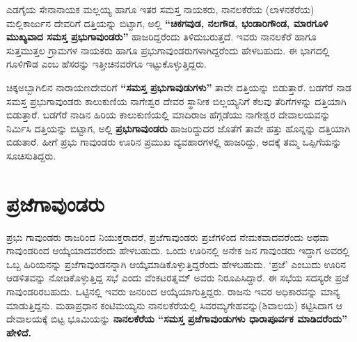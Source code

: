 ಎಡಗೈಯ ಸೇನಾನಾಯಕ ಮಲ್ಲಯ್ಯ ಹಾಗೂ ಇತರ ಸಮಸ್ತ ನಾಯಕರು, ನಾನಲಕೆರೆಯ (ಲಾಳನಕೆರೆಯ) ಮಲ್ಲಿಕಾರ್ಜುನ ದೇವರಿಗೆ ದತ್ತಿಯನ್ನು ಬಿಟ್ಟಾಗ, ಅಲ್ಲಿ \textbf{“ಚಿಕಗವುಡ, ನಲಗೌಡ, ಭಂಡಾರಿಗೌಂಡ, ಮಾರಗೂಳಿ ಮುಖ್ಯವಾದ ಸಮಸ್ತ ಪ್ರಭುಗಾವುಂಡರು”} ಹಾಜರಿದ್ದರೆಂದು ತಿಳಿದುಬರುತ್ತದೆ. ಇವರು ನಾನಲಕೆರೆ ಹಾಗೂ ಸುತ್ತಮುತ್ತಲ ಗ್ರಾಮಗಳ ನಾಯಕರು ಹಾಗೂ ಪ್ರಭುಗಾವುಂಡರುಗಳಾಗಿದ್ದರೆಂದು ಹೇಳಬಹುದು. ಈ ಭಾಗದಲ್ಲಿ ಗೂಳಿಗೌಡ ಎಂಬ ಹೆಸರನ್ನು ಇತ್ತೀಚಿನವರೆಗೂ ಇಟ್ಟುಕೊಳ್ಳುತ್ತಿದ್ದರು.

ಚಿಕ್ಕಅಬ್ಬಾಗಿಲಿನ ನಾರಾಯಣದೇವರಿಗೆ \textbf{“ಸಮಸ್ತ ಪ್ರಭುಗಾವುಡುಗಳು”} ತಾವೇ ದತ್ತಿಯನ್ನು ಬಿಡುತ್ತಾರೆ. ಬಡಗೆರೆ ನಾಡ ಸಮಸ್ತ ಪ್ರಭುಗಾವುಂಡರು ಕಾಲುಕುಣಿಯ ನಾಗೇಶ್ವರ ದೇವರ ಸ್ಥಾನೀಕ ಬಿಲ್ಲಯ್ಯನಿಗೆ ಕೆಲವು ತೆರಿಗೆಗಳನ್ನು ದತ್ತಿಯಾಗಿ ಬಿಡುತ್ತಾರೆ. ಬಡಗೆರೆ ನಾಡಿನ ಹಿರಿಯ ಕಾಲುಕುಣಿಯಲ್ಲಿ ಮಾದಿರಾಜ ಹೆಗ್ಗಡೆಯು ನಾಗೇಶ್ವರ ದೇವಾಲಯವನ್ನು ನಿರ್ಮಿಸಿ ದತ್ತಿಯನ್ನು ಬಿಟ್ಟಾಗ, ಅಲ್ಲಿ \textbf{ಪ್ರಭುಗಾವುಂಡರು} ಹಾಜರಿದ್ದುದರ ಜೊತೆಗೆ ತಾವೇ ಹತ್ತು ಹೊನ್ನನ್ನು ದತ್ತಿಯಾಗಿ ಬಿಡುತಾರೆ. ಹೀಗೆ ಪ್ರಭು ಗಾವುಂಡರು ಊರಿನ ಪ್ರಮುಖ ವ್ಯವಹಾರಗಳಲ್ಲಿ ಹಾಜರಿದ್ದು, ಅದಕ್ಕೆ ತಮ್ಮ ಒಪ್ಪಿಗೆಯನ್ನು ಸೂಚಿಸುತಿದ್ದರು.


\section{ಪ್ರಜೆಗಾವುಂಡರು}

ಪ್ರಭು ಗಾವುಂಡರು ರಾಜರಿಂದ ನಿಯುಕ್ತರಾದರೆ, ಪ್ರಜೆಗಾವುಂಡರು ಪ್ರಜೆಗಳಿಂದ ನೇಮಕವಾದವರೆಂದು ಅಥವಾ ಗಾವುಂಡ\-ರಿಂದ ಆಯ್ಕೆಯಾದವರೆಂದು ಹೇಳಬಹುದು. ಒಂದು ಊರಿನಲ್ಲಿ ಅನೇಕ ಜನ ಗಾವುಂಡರು ಇದ್ದಾಗ ಅವರಲ್ಲಿ ಒಬ್ಬ ಹಿರಿಯನನ್ನು ಪ್ರಜೆಗಾವುಂಡನನ್ನಾಗಿ ಆಯ್ಕೆಮಾಡಿಕೊಳ್ಳುತ್ತಿದ್ದರೆಂದು ಹೇಳಬಹುದು. ‘ಪ್ರಜೆ’ ಎಂಬುದು ಊರಿನ ಆಡಳಿತವನ್ನು ನೋಡಿ\-ಕೊಳ್ಳುತ್ತಿದ್ದ ಸಭೆ ಎಂದು ವೆಂಕಟರತ್ನಮ್ ಅವರು ನಿರೂಪಿಸಿದ್ದಾರೆ. ಈ ಸಭೆಯ ಸದಸ್ಯರೇ ಪ್ರಜೆ ಗಾವುಂಡರಿರಬಹುದು. ಒಟ್ಟಿನಲ್ಲಿ ಇವರು ಜನರಿಂದ ಆಯ್ಕೆಯಾಗುತ್ತಿದ್ದರು. ರಾಜನು ಇವರ ಅಧಿಕಾರವನ್ನು ಮಾನ್ಯ ಮಾಡುತ್ತಿದ್ದನು. ಮಹಾಪ್ರಧಾನ ಕಂಟಿಮಯ್ಯನು ನಾನಲಕೆರೆಯಲ್ಲಿ ಸಿವರಮ್ಯಗೇಹವನ್ನು(ಶಿವಾಲಯ) ಕಟ್ಟಿಸಿದಾಗ ಆ ದೇವಾಲಯಕ್ಕೆ ಬಿಟ್ಟ ಭೂಮಿಯನ್ನು \textbf{ನಾನಲಕೆರೆಯ “ಸಮಸ್ತ ಪ್ರಜೆಗಾವುಂಡುಗಳು ಧಾರಾಪೂರ್ವಕ ಮಾಡಿದರೆಂದು” ಹೇಳಿದೆ.}

